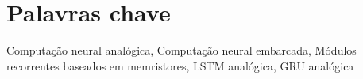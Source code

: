 \section*{Palavras chave}
Computa\c{c}\~ao neural anal\'{o}gica, Computa\c{c}\~ao neural embarcada, M\'odulos recorrentes baseados em memristores, LSTM anal\'ogica, GRU anal\'ogica
\clearpage
\thispagestyle{empty}
\cleardoublepage
